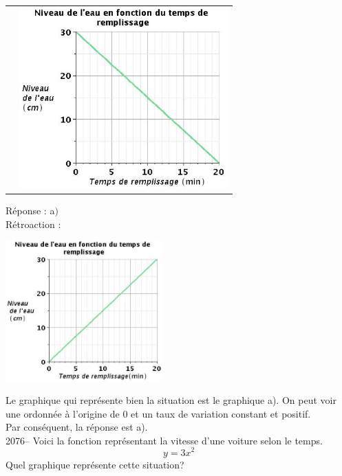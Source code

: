 \documentclass[letterpaper, 12pt]{article}
\begin{document}
\begin{tabular}{l l}
&

 \includegraphics[width=8cm,bb=14 14 473 415]{Q2075e.eps}

\end{tabular}

R\'eponse : a$)$\\

R\'etroaction :\\
\begin{center}
 \includegraphics[width=6cm,bb=14 14 463 415]{Q2075b.eps}
\end{center}
Le graphique qui repr\'esente bien la situation est le graphique a). On peut voir une ordonn\'ee \`a l'origine de 0 et un taux de variation constant et positif.\\
Par cons\'equent, la r\'eponse est a).\\

2076-- Voici la fonction repr\'esentant la vitesse d'une voiture selon le temps.
\begin{equation*}
 y=3x ^ {2}
\end{equation*}
Quel graphique repr\'esente cette situation?
\end{document}
